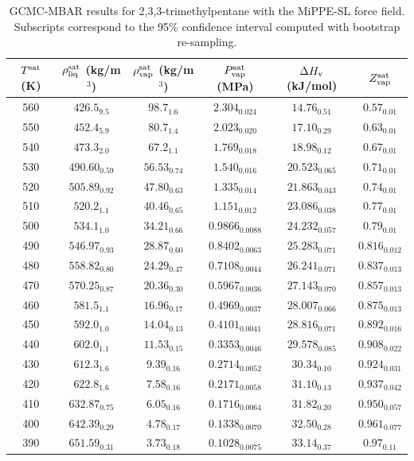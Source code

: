 \documentclass[journal=jctc,manuscript=article]{achemso}
\begin{document}
\begin{table}[htb!]
	\caption{GCMC-MBAR results for 2,3,3-trimethylpentane with the MiPPE-SL force field. Subscripts correspond to the 95\% confidence interval computed with bootstrap re-sampling.}
	\begin{center}
		\begin{tabular}{|c|c|c|c|c|c|}
			\hline
			$T^{\rm sat}$ (K) & $\rho_{\rm liq}^{\rm sat}$ (kg/m$^3$) & $\rho_{\rm vap}^{\rm sat}$ (kg/m$^3$) & $P_{\rm vap}^{\rm sat}$ (MPa) & $\Delta H_{\rm v}$ (kJ/mol) & $Z_{\rm vap}^{\rm sat}$ \\ \hline
			560 & $426.5_{9.5}$ & $98.7_{1.6}$ & $2.304_{0.024}$ & $14.76_{0.51}$ & $0.57_{0.01}$ \\
			550 & $452.4_{5.9}$ & $80.7_{1.4}$ & $2.023_{0.020}$ & $17.10_{0.29}$ & $0.63_{0.01}$ \\
			540 & $473.3_{2.0}$ & $67.2_{1.1}$ & $1.769_{0.018}$ & $18.98_{0.12}$ & $0.67_{0.01}$ \\
			530 & $490.60_{0.59}$ & $56.53_{0.74}$ & $1.540_{0.016}$ & $20.523_{0.065}$ & $0.71_{0.01}$ \\
			520 & $505.89_{0.92}$ & $47.80_{0.63}$ & $1.335_{0.014}$ & $21.863_{0.043}$ & $0.74_{0.01}$ \\
			510 & $520.2_{1.1}$ & $40.46_{0.65}$ & $1.151_{0.012}$ & $23.086_{0.038}$ & $0.77_{0.01}$ \\
			500 & $534.1_{1.0}$ & $34.21_{0.66}$ & $0.9866_{0.0088}$ & $24.232_{0.057}$ & $0.79_{0.01}$ \\
			490 & $546.97_{0.93}$ & $28.87_{0.60}$ & $0.8402_{0.0063}$ & $25.283_{0.071}$ & $0.816_{0.012}$ \\
			480 & $558.82_{0.80}$ & $24.29_{0.47}$ & $0.7108_{0.0044}$ & $26.241_{0.071}$ & $0.837_{0.013}$ \\
			470 & $570.25_{0.87}$ & $20.36_{0.30}$ & $0.5967_{0.0036}$ & $27.143_{0.070}$ & $0.857_{0.013}$ \\
			460 & $581.5_{1.1}$ & $16.96_{0.17}$ & $0.4969_{0.0037}$ & $28.007_{0.066}$ & $0.875_{0.013}$ \\
			450 & $592.0_{1.0}$ & $14.04_{0.13}$ & $0.4101_{0.0041}$ & $28.816_{0.071}$ & $0.892_{0.016}$ \\
			440 & $602.0_{1.1}$ & $11.53_{0.15}$ & $0.3353_{0.0046}$ & $29.578_{0.085}$ & $0.908_{0.022}$ \\
			430 & $612.3_{1.6}$ & $9.39_{0.16}$ & $0.2714_{0.0052}$ & $30.34_{0.10}$ & $0.924_{0.031}$ \\
			420 & $622.8_{1.6}$ & $7.58_{0.16}$ & $0.2171_{0.0058}$ & $31.10_{0.13}$ & $0.937_{0.042}$ \\
			410 & $632.87_{0.75}$ & $6.05_{0.16}$ & $0.1716_{0.0064}$ & $31.82_{0.20}$ & $0.950_{0.057}$ \\
			400 & $642.39_{0.29}$ & $4.78_{0.17}$ & $0.1338_{0.0070}$ & $32.50_{0.28}$ & $0.961_{0.077}$ \\
			390 & $651.59_{0.31}$ & $3.73_{0.18}$ & $0.1028_{0.0075}$ & $33.14_{0.37}$ & $0.97_{0.11}$ \\
			\hline
		\end{tabular}
	\end{center}
\end{table}
\end{document}
